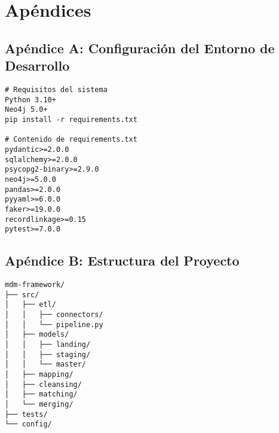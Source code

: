 \documentclass[12pt]{article}
\begin{document}
\section*{Apéndices}

\subsection*{Apéndice A: Configuración del Entorno de Desarrollo}
\begin{verbatim}
# Requisitos del sistema
Python 3.10+
Neo4j 5.0+
pip install -r requirements.txt

# Contenido de requirements.txt
pydantic>=2.0.0
sqlalchemy>=2.0.0
psycopg2-binary>=2.9.0
neo4j>=5.0.0
pandas>=2.0.0
pyyaml>=6.0.0
faker>=19.0.0
recordlinkage>=0.15
pytest>=7.0.0
\end{verbatim}

\subsection*{Apéndice B: Estructura del Proyecto}
\begin{verbatim}
mdm-framework/
├── src/
│   ├── etl/
│   │   ├── connectors/
│   │   └── pipeline.py
│   ├── models/
│   │   ├── landing/
│   │   ├── staging/
│   │   └── master/
│   ├── mapping/
│   ├── cleansing/
│   ├── matching/
│   └── merging/
├── tests/
└── config/
\end{verbatim}
\end{document}
